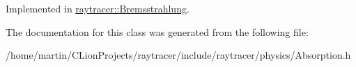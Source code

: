 Implemented in \hyperlink{structraytracer_1_1Bremsstrahlung_a510d57af7c09bb24d786afab8086b748}{raytracer\+::\+Bremsstrahlung}.



The documentation for this class was generated from the following file\+:\begin{DoxyCompactItemize}
\item 
/home/martin/\+C\+Lion\+Projects/raytracer/include/raytracer/physics/Absorption.\+h\end{DoxyCompactItemize}
